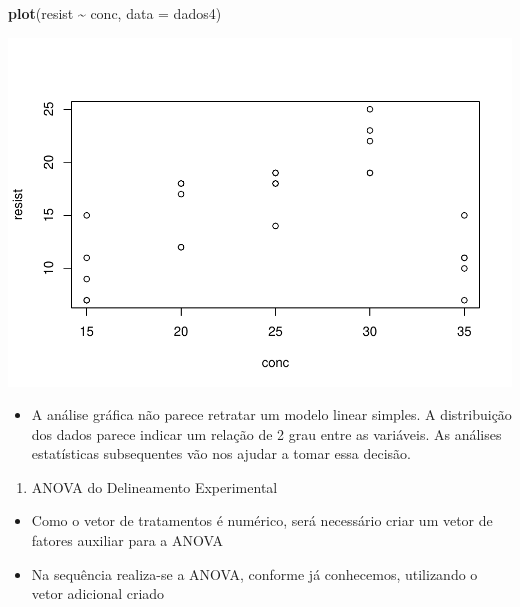 \documentclass[
]{book}
\newenvironment{Shaded}{\begin{snugshade}}{\end{snugshade}}
\newcommand{\AttributeTok}[1]{\textcolor[rgb]{0.13,0.29,0.53}{#1}}
\newcommand{\FunctionTok}[1]{\textcolor[rgb]{0.13,0.29,0.53}{\textbf{#1}}}
\newcommand{\NormalTok}[1]{#1}
\newcommand{\OtherTok}[1]{\textcolor[rgb]{0.56,0.35,0.01}{#1}}
\newcommand{\SpecialCharTok}[1]{\textcolor[rgb]{0.81,0.36,0.00}{\textbf{#1}}}
\providecommand{\tightlist}{%
  \setlength{\itemsep}{0pt}\setlength{\parskip}{0pt}}
\begin{document}
\begin{Shaded}
\begin{Highlighting}[]
\FunctionTok{plot}\NormalTok{(resist }\SpecialCharTok{\textasciitilde{}}\NormalTok{ conc, }\AttributeTok{data =}\NormalTok{ dados4)}
\end{Highlighting}
\end{Shaded}

\includegraphics[width=0.5\linewidth]{_main_files/figure-latex/graph3-1}

\begin{itemize}
\tightlist
\item
  A análise gráfica não parece retratar um modelo linear simples. A distribuição dos dados parece indicar um relação de 2 grau entre as variáveis. As análises estatísticas subsequentes vão nos ajudar a tomar essa decisão.
\end{itemize}

\begin{enumerate}
\def\labelenumi{\arabic{enumi}.}
\setcounter{enumi}{2}
\tightlist
\item
  ANOVA do Delineamento Experimental
\end{enumerate}

\begin{itemize}
\tightlist
\item
  Como o vetor de tratamentos é numérico, será necessário criar um vetor de fatores auxiliar para a ANOVA
\end{itemize}

\begin{Shaded}
\end{Shaded}

\begin{itemize}
\tightlist
\item
  Na sequência realiza-se a ANOVA, conforme já conhecemos, utilizando o vetor adicional criado
\end{itemize}
\end{document}
